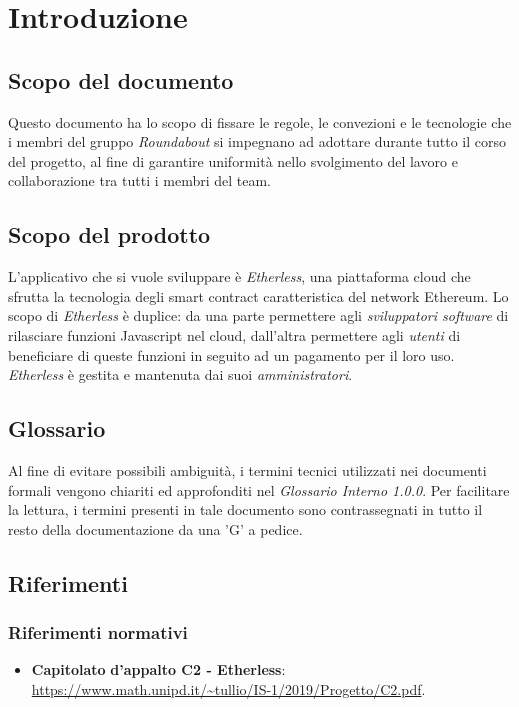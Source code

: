 \section{Introduzione}

\subsection{Scopo del documento}
Questo documento ha lo scopo di fissare le regole, le convezioni e le tecnologie che i membri del gruppo \textit{Roundabout} si impegnano ad adottare durante tutto il corso del progetto, al fine di garantire uniformità nello svolgimento del lavoro e collaborazione tra tutti i membri del team.

\subsection{Scopo del prodotto}
L'applicativo che si vuole sviluppare è \textit{Etherless}, una piattaforma cloud che sfrutta la tecnologia degli smart contract caratteristica del network Ethereum. Lo scopo di \textit{Etherless} è duplice: da una parte permettere agli \textit{sviluppatori software} di rilasciare funzioni Javascript nel cloud, dall'altra permettere agli \textit{utenti} di beneficiare di queste funzioni in seguito ad un pagamento per il loro uso. 
\textit{Etherless} è gestita e mantenuta dai suoi \textit{amministratori}.

\subsection{Glossario}
Al fine di evitare possibili ambiguità, i termini tecnici utilizzati nei documenti formali vengono chiariti ed approfonditi nel \textit{Glossario Interno 1.0.0}. Per facilitare la lettura, i termini presenti in tale documento sono contrassegnati in tutto il resto della documentazione da una 'G' a pedice.

\subsection{Riferimenti}

	\subsubsection{Riferimenti normativi}
	\begin{itemize}
		\item \textbf{Capitolato}\textbf{ d'appalto C2 - Etherless}: \\
		\url{https://www.math.unipd.it/~tullio/IS-1/2019/Progetto/C2.pdf}.
	\end{itemize}
	
